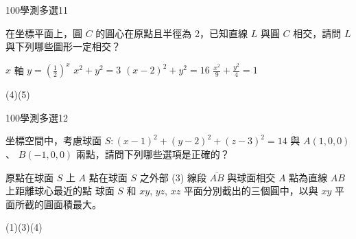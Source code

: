     \begin{QUESTION}
        \begin{ExamInfo}{100}{學測}{多選}{11}
        \end{ExamInfo}
        \begin{ExamAnsRateInfo}{47}{76}{46}{19}
        \end{ExamAnsRateInfo}
        \begin{QBODY}
            在坐標平面上，圓 $C$ 的圓心在原點且半徑為 2，已知直線 $L$ 與圓 $C$ 相交，請問 $L$ 與下列哪些圖形一定相交？ 
			\begin{QOPS}
				\QOP $x$ 軸 
				\QOP $y = (\frac{1}{2})^x$    
				\QOP  $x^2 +y^2 =3$    \QOP $(x-2)^2 +y^2 =16$ 
				\QOP $\frac{x^2}{9} +\frac{y^2}{4} =1$
			\end{QOPS}
        \end{QBODY}
        \begin{QFROMS}
        \end{QFROMS}
        \begin{QTAGS}\end{QTAGS}
        \begin{QANS}
            (4)(5)
        \end{QANS}
        \begin{QSOLLIST}
        \end{QSOLLIST}
        \begin{QEMPTYSPACE}
        \end{QEMPTYSPACE}
    \end{QUESTION}
    \begin{QUESTION}
        \begin{ExamInfo}{100}{學測}{多選}{12}
        \end{ExamInfo}
        \begin{ExamAnsRateInfo}{54}{84}{53}{25}
        \end{ExamAnsRateInfo}
        \begin{QBODY}
            坐標空間中，考慮球面 $S:(x-1)^2+(y-2)^2+(z-3)^2 = 14 $ 與 $A(1,0,0)$ 、 $B(-1,0,0)$ 兩點，請問下列哪些選項是正確的？ 
			\begin{QOPS} 
				\QOP 原點在球面 $S$ 上 
				\QOP $A$ 點在球面 $S$ 之外部 (3) 線段 $\overline{AB}$ 與球面相交 
				\QOP $A$ 點為直線 $AB$ 上距離球心最近的點  
				\QOP 球面 $S$ 和 $xy$, $yz$, $xz$ 平面分別截出的三個圓中，以與 $xy$ 平面所截的圓面積最大。
			\end{QOPS}
        \end{QBODY}
        \begin{QFROMS}
        \end{QFROMS}
        \begin{QTAGS}\end{QTAGS}
        \begin{QANS}
            (1)(3)(4)
        \end{QANS}
        \begin{QSOLLIST}
        \end{QSOLLIST}
        \begin{QEMPTYSPACE}
        \end{QEMPTYSPACE}
    \end{QUESTION}
